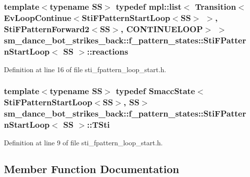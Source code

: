 \subsubsection[{\texorpdfstring{reactions}{reactions}}]{\setlength{\rightskip}{0pt plus 5cm}template$<$typename SS$>$ typedef mpl\+::list$<$ Transition$<$Ev\+Loop\+Continue$<${\bf Sti\+F\+Pattern\+Start\+Loop}$<$SS$>$ $>$, {\bf Sti\+F\+Pattern\+Forward2}$<$SS$>$, C\+O\+N\+T\+I\+N\+U\+E\+L\+O\+OP$>$ $>$ {\bf sm\+\_\+dance\+\_\+bot\+\_\+strikes\+\_\+back\+::f\+\_\+pattern\+\_\+states\+::\+Sti\+F\+Pattern\+Start\+Loop}$<$ SS $>$\+::{\bf reactions}}\hypertarget{structsm__dance__bot__strikes__back_1_1f__pattern__states_1_1StiFPatternStartLoop_a2f2035f8c31ad2fb1e29711013ce79fa}{}\label{structsm__dance__bot__strikes__back_1_1f__pattern__states_1_1StiFPatternStartLoop_a2f2035f8c31ad2fb1e29711013ce79fa}


Definition at line 16 of file sti\+\_\+fpattern\+\_\+loop\+\_\+start.\+h.

\subsubsection[{\texorpdfstring{T\+Sti}{TSti}}]{\setlength{\rightskip}{0pt plus 5cm}template$<$typename SS$>$ typedef {\bf Smacc\+State}$<${\bf Sti\+F\+Pattern\+Start\+Loop}$<$SS$>$, SS$>$ {\bf sm\+\_\+dance\+\_\+bot\+\_\+strikes\+\_\+back\+::f\+\_\+pattern\+\_\+states\+::\+Sti\+F\+Pattern\+Start\+Loop}$<$ SS $>$\+::{\bf T\+Sti}}\hypertarget{structsm__dance__bot__strikes__back_1_1f__pattern__states_1_1StiFPatternStartLoop_a3c1089e9485fca72295426898cb9e3d8}{}\label{structsm__dance__bot__strikes__back_1_1f__pattern__states_1_1StiFPatternStartLoop_a3c1089e9485fca72295426898cb9e3d8}


Definition at line 9 of file sti\+\_\+fpattern\+\_\+loop\+\_\+start.\+h.



\subsection{Member Function Documentation}
